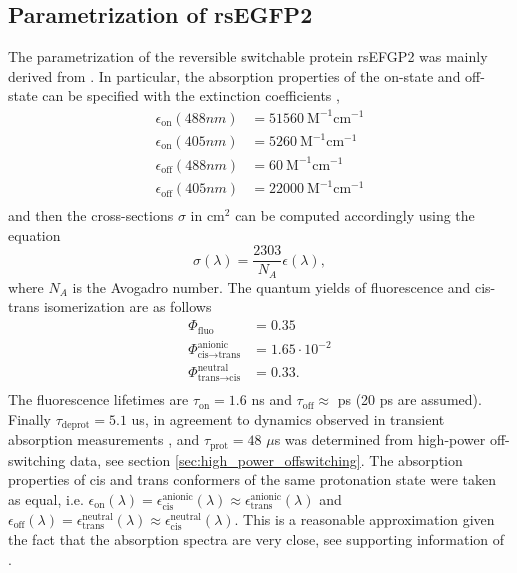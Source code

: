 \documentclass{article}
\begin{document}
\subsection{Parametrization of rsEGFP2}\label{sec:rs2_parametrization}
The parametrization of the reversible switchable protein rsEFGP2 was mainly derived from \cite{Khatib2016}.
In particular, the absorption properties of the on-state and off-state can be specified with the extinction coefficients \cite{Khatib2016},
\begin{equation}
    \begin{aligned}
        \epsilon_{\text{on}} (488 nm) &= 51560 \ \text{M}^{-1} \text{cm}^{-1} \\
        \epsilon_{\text{on}} (405 nm) &= 5260 \ \text{M}^{-1} \text{cm}^{-1} \\
        \epsilon_{\text{off}} (488 nm) &= 60 \ \text{M}^{-1} \text{cm}^{-1} \\
        \epsilon_{\text{off}} (405 nm) &= 22000 \ \text{M}^{-1} \text{cm}^{-1} \\
    \end{aligned}
\end{equation}
and then the cross-sections $\sigma$ in cm$^2$ can be computed accordingly using the equation \cite{TkachenkoBook}
\begin{equation}
    \sigma(\lambda) = \frac{2303}{N_A}\epsilon(\lambda),
\end{equation}
where $N_A$ is the Avogadro number.
The quantum yields of fluorescence and cis-trans isomerization are as follows \cite{Khatib2016}
\begin{equation}
    \begin{aligned}
        \Phi_\text{fluo} &= 0.35 \\
        \Phi^{\text{anionic}}_{\text{cis} \rightarrow \text{trans}} &= 1.65 \cdot 10^{-2} \\
        \Phi^{\text{neutral}}_{\text{trans} \rightarrow \text{cis}} &= 0.33. \\
    \end{aligned}
\end{equation}
The fluorescence lifetimes are $\tau_\text{on} = 1.6$ ns \cite{Testa2015} and $\tau_\text{off} \approx$ ps \cite{Woodhouse2020} (20 ps are assumed). Finally $\tau_\text{deprot} = 5.1$ us, in agreement to dynamics observed in transient absorption measurements \cite{Woodhouse2020}, and $\tau_\text{prot} = 48$ $\mu$s was determined from high-power off-switching data, see section \ref{sec:high_power_offswitching}.
The absorption properties of cis and trans conformers of the same protonation state were taken as equal, i.e. $\epsilon_\text{on}(\lambda) = \epsilon_\text{cis}^\text{anionic}(\lambda) \approx \epsilon_\text{trans}^\text{anionic}(\lambda)$ and $\epsilon_\text{off}(\lambda) = \epsilon_\text{trans}^\text{neutral}(\lambda) \approx \epsilon_\text{cis}^\text{neutral}(\lambda)$. This is a reasonable approximation given the fact that the absorption spectra are very close, see supporting information of \cite{Woodhouse2020}.
\end{document}
